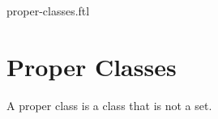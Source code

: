 \documentclass{naproche-library}
\begin{document}
\begin{smodule}{proper-classes.ftl}

  \section*{Proper Classes}

  \begin{definition}[forthel,id=FOUNDATIONS_10_8452102365965847]
    A proper class is a class that is not a set.
  \end{definition}
\end{smodule}
\end{document}
